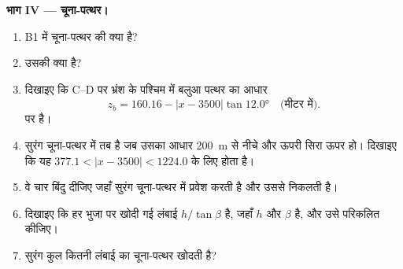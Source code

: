 \begin{problem}[{सप्ताहांत समस्या --- कौन-सी चट्टानें सुरंग काटेगी, वह भ्रंश से कहाँ मिलेगी, और वह कितना चूना-पत्थर खोदेगी}]
\medskip
\noindent\textbf{भाग IV --- चूना-पत्थर।}
\begin{enumerate}[resume]
  \item B1 में चूना-पत्थर की  क्या है?
  \item उसकी  क्या है?
  \item दिखाइए कि C--D पर भ्रंश के पश्चिम में बलुआ पत्थर का आधार
        \[ z_b = 160.16 - |x - 3500|\tan\ang{12.0} \quad\text{(मीटर में)}. \]
        पर है।
  \item सुरंग चूना-पत्थर में तब है जब उसका आधार \qty{200}{m} से नीचे और ऊपरी सिरा ऊपर हो। दिखाइए कि यह
        $377.1 < |x - 3500|
        < 1224.0$ के लिए होता है।
  \item वे चार बिंदु दीजिए जहाँ सुरंग चूना-पत्थर में प्रवेश करती है और उससे निकलती है।
  \item दिखाइए कि हर भुजा पर खोदी गई लंबाई $h/\tan\beta$ है, जहाँ $h$  और $\beta$  है, और उसे परिकलित कीजिए।
  \item सुरंग कुल कितनी लंबाई का चूना-पत्थर खोदती है?
\end{enumerate}
\end{problem}
